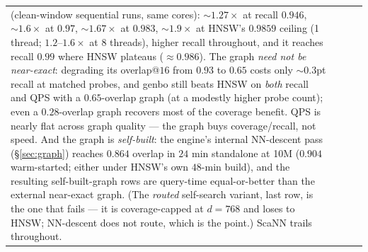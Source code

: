 \documentclass{article}
\begin{document}
\begin{table}[t]
\begin{tabular}{llcc}
{(clean-window sequential runs, same cores): ${\sim}1.27\times$ at recall $0.946$,
${\sim}1.6\times$ at $0.97$, ${\sim}1.67\times$ at $0.983$, ${\sim}1.9\times$ at HNSW's
$0.9859$ ceiling (1 thread; $1.2$--$1.6\times$ at 8 threads), higher recall throughout, and it
reaches recall $0.99$ where HNSW plateaus ($\approx\!0.986$). The graph \emph{need not be
near-exact}: degrading its overlap@$16$ from $0.93$ to $0.65$ costs only ${\sim}0.3$pt recall at
matched probes, and genbo still beats HNSW on \emph{both} recall and QPS with a $0.65$-overlap graph
(at a modestly higher probe count); even a $0.28$-overlap graph recovers most of the coverage benefit.
QPS is nearly flat across graph quality --- the graph buys coverage/recall, not speed.
And the graph is \emph{self-built}: the engine's internal NN-descent pass (\S\ref{sec:graph})
reaches $0.864$ overlap in $24$ min standalone at 10M ($0.904$ warm-started; either under
HNSW's own $48$-min build), and the resulting self-built-graph rows are
query-time equal-or-better than the external near-exact graph. (The
\emph{routed} self-search variant, last row, is the one that fails --- it is coverage-capped
at $d{=}768$ and loses to HNSW; NN-descent does not route, which is the point.)
ScaNN trails throughout.}
\end{tabular}
\end{table}
\end{document}
